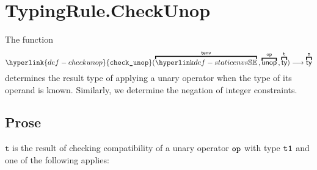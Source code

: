 \documentclass{book}
\newcommand\CheckUnop[0]{\hyperlink{def-checkunop}{\texttt{check\_unop}}}
\newcommand\vt[0]{\texttt{t}}
\newcommand\vs[0]{\texttt{s}}
\begin{document}
\section{TypingRule.CheckUnop \label{sec:TypingRule.CheckUnop}}
\hypertarget{def-checkunop}{}
The function
\[
  \CheckUnop(\overname{\staticenvs}{\tenv} \aslsep \overname{\unop}{\op} \aslsep \overname{\ty}{\vt})
  \aslto \overname{\ty}{\vs}
\]
determines the result type of applying a unary operator when the type of its operand is known.
Similarly, we determine the negation of integer constraints.

\subsection{Prose}
  $\vt$ is the result of checking compatibility of a unary operator $\texttt{op}$ with
  type $\texttt{t1}$ and one of the following applies:
\end{document}
